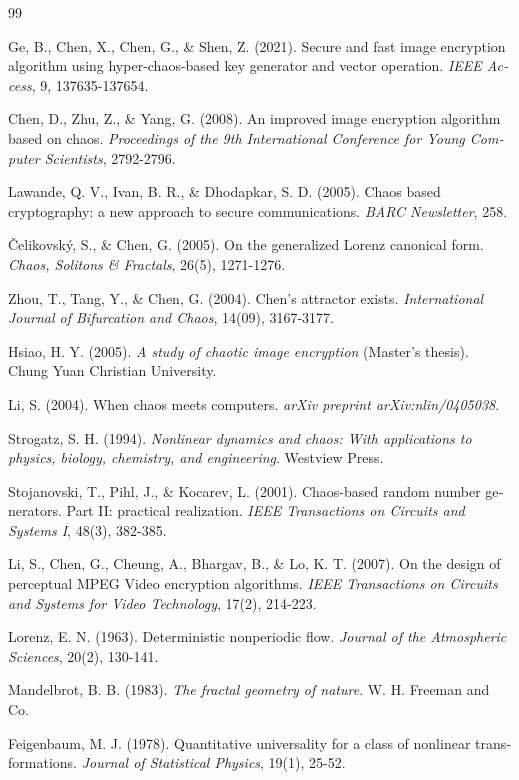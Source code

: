 \documentclass[a4paper,12pt]{report}
\renewcommand{\%}{\lr{\oldpercent}}
\begin{document}
\begin{thebibliography}{99}
\begin{LTRbibitems}
\begin{latin}
 Ge, B., Chen, X., Chen, G., \& Shen, Z. (2021). Secure and fast image encryption algorithm using hyper-chaos-based key generator and vector operation. \textit{IEEE Access}, 9, 137635-137654.

 Chen, D., Zhu, Z., \& Yang, G. (2008). An improved image encryption algorithm based on chaos. \textit{Proceedings of the 9th International Conference for Young Computer Scientists}, 2792-2796.

 Lawande, Q. V., Ivan, B. R., \& Dhodapkar, S. D. (2005). Chaos based cryptography: a new approach to secure communications. \textit{BARC Newsletter}, 258.

 Čelikovský, S., \& Chen, G. (2005). On the generalized Lorenz canonical form. \textit{Chaos, Solitons \& Fractals}, 26(5), 1271-1276.

 Zhou, T., Tang, Y., \& Chen, G. (2004). Chen's attractor exists. \textit{International Journal of Bifurcation and Chaos}, 14(09), 3167-3177.

 Hsiao, H. Y. (2005). \textit{A study of chaotic image encryption} (Master's thesis). Chung Yuan Christian University.

 Li, S. (2004). When chaos meets computers. \textit{arXiv preprint arXiv:nlin/0405038}.

 Strogatz, S. H. (1994). \textit{Nonlinear dynamics and chaos: With applications to physics, biology, chemistry, and engineering}. Westview Press.

 Stojanovski, T., Pihl, J., \& Kocarev, L. (2001). Chaos-based random number generators. Part II: practical realization. \textit{IEEE Transactions on Circuits and Systems I}, 48(3), 382-385.

 Li, S., Chen, G., Cheung, A., Bhargav, B., \& Lo, K. T. (2007). On the design of perceptual MPEG Video encryption algorithms. \textit{IEEE Transactions on Circuits and Systems for Video Technology}, 17(2), 214-223.

 Lorenz, E. N. (1963). Deterministic nonperiodic flow. \textit{Journal of the Atmospheric Sciences}, 20(2), 130-141.

 Mandelbrot, B. B. (1983). \textit{The fractal geometry of nature}. W. H. Freeman and Co.

 Feigenbaum, M. J. (1978). Quantitative universality for a class of nonlinear transformations. \textit{Journal of Statistical Physics}, 19(1), 25-52.


\end{latin}
\end{LTRbibitems}
\end{thebibliography}
\end{document}
